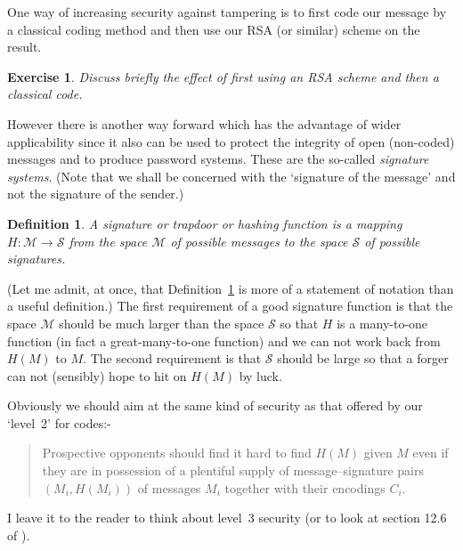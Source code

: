 \documentclass[12pt,a4paper]{article}
\theoremstyle{plain}
\newtheorem{definition}[theorem]{Definition}
\newtheorem{exercise}[theorem]{Exercise}
\theoremstyle{definition}
\begin{document}
One way of increasing security against tampering
is to first code our message by a classical coding
method and then use our RSA (or similar) scheme
on the result.
\begin{exercise} Discuss briefly the effect
of first using an RSA scheme and then a classical
code.
\end{exercise}
However there is another way forward which has the
advantage of wider applicability since it
also can be used
to protect the integrity of open (non-coded) messages
and to produce password systems. These are
the so-called \emph{signature systems}.
(Note that we shall be concerned with the
`signature of the message' and not the
signature of the sender.)

\begin{definition}\label{Hash}
A  \emph{signature} or \emph{trapdoor}
or \emph{hashing}
function is a mapping
$H:{\mathcal M}\rightarrow{\mathcal S}$
from the space ${\mathcal M}$ of possible messages
to the space ${\mathcal S}$ of possible signatures.
\end{definition}
\noindent
(Let me admit, at once,
that Definition~\ref{Hash} is more of a statement
of notation than a useful definition.)
The first requirement of a good signature function
is that the space ${\mathcal M}$ should be
much larger than the space ${\mathcal S}$
so that $H$ is a many-to-one function (in fact
a great-many-to-one function) and we can not
work back from $H(M)$ to $M$.  The second requirement
is that ${\mathcal S}$  should be large
so that a forger can not (sensibly) hope
to hit on $H(M)$ by luck.

Obviously we should aim at the same kind of security
as that offered by our `level~2' for codes:-
\begin{quote}
Prospective opponents should find
it hard to find $H(M)$ given $M$ even
if they are in possession of
a plentiful supply of message--signature pairs
$(M_{i},H(M_{i}))$
of messages $M_{i}$ together with their encodings $C_{i}$.
\end{quote}
I leave it to the reader to think about level~3
security (or to look at section 12.6 of \cite{Welsh}).
\end{document}
